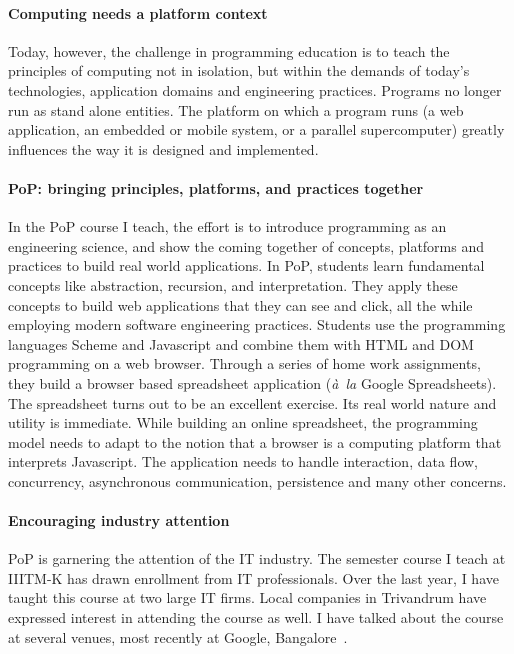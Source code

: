 \documentclass[
9pt, 
]{article}
\begin{document}
\paragraph{Computing needs a platform context}
Today, however, the challenge in programming education is to
teach the principles of computing not in isolation, but
within the demands of today's technologies, application
domains and engineering practices.  Programs no longer run
as stand alone entities.  The platform on which a program
runs (a web application, an embedded or mobile system, or a
parallel supercomputer) greatly influences the way it is
designed and implemented.

\paragraph{PoP:  bringing principles, platforms, and practices together}
In the PoP course I teach, the effort is to introduce
programming as an engineering science, and show the coming
together of concepts, platforms and practices to build real
world applications.  In PoP, students learn fundamental
concepts like abstraction, recursion, and interpretation.
They apply these concepts to build web applications that
they can see and click, all the while employing modern
software engineering practices.  Students use the
programming languages Scheme and Javascript and combine them
with HTML and DOM programming on a web browser.  Through a
series of home work assignments, they build a browser based
spreadsheet application ({\em \`a~la\/} Google
Spreadsheets).  The spreadsheet turns out to be an excellent
exercise.  Its real world nature and utility is immediate.
While building an online spreadsheet, the programming model
needs to adapt to the notion that a browser is a computing
platform that interprets Javascript.  The application needs
to handle interaction, data flow, concurrency, asynchronous
communication, persistence and many other concerns.

\paragraph{Encouraging industry attention}
PoP is garnering the attention of the IT industry.  The
semester course I teach at IIITM-K has drawn enrollment from
IT professionals.  Over the last year, I have taught this
course at two large IT firms.  Local companies in Trivandrum
have expressed interest in attending the course as well.  I
have talked about the course at several venues, most
recently at Google, Bangalore~\cite{venk-google-talk-2008}.
\end{document}

